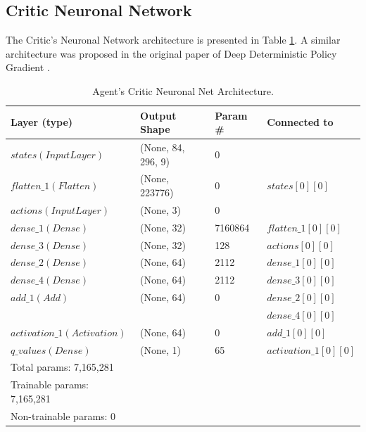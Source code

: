 \documentclass[peerreview,onecolumn]{IEEEtran}
\begin{document}
	 \subsection{Critic Neuronal Network}
	 
	 The Critic's Neuronal Network architecture is presented in Table \ref{tab:critic_arch}. A similar architecture was proposed in the original paper of Deep Deterministic Policy Gradient \cite{ddpg_2015}. 
	 
	 
	 
	  \begin{table}[h] 
	\centering
	\begin{tabular}{l l l l} 
		\toprule 				
		Layer (type)          &          Output Shape   &      Param \#   &  Connected to  \\
		\midrule           
		$states (InputLayer) $   &         (None, 84, 296, 9)  & 0 &    \\                          
		$flatten\_1 (Flatten) $   &         (None, 223776) &      0 &          $states[0][0]   $    \\
		$actions (InputLayer)$  &  (None, 3)    &        0      &             \\
		$dense\_1 (Dense)  $ &  (None, 32)  & 7160864  &   $flatten\_1[0][0] $ \\
        $dense\_3 (Dense)  $ & (None, 32) & 128 &  $actions[0][0]$ \\
		$dense\_2 (Dense) $  & (None, 64) & 2112  &  $dense\_1[0][0] $ \\ 
        $dense\_4 (Dense) $ & (None, 64) & 2112 &  $dense\_3[0][0]$ \\
		$add\_1 (Add) $ & (None, 64) &  0  & $dense\_2[0][0] $ \\                   
                                                                &&& $dense\_4[0][0] $ \\
		$activation\_1 (Activation) $ & (None, 64) & 0 & $add\_1[0][0]$ \\
		$q\_values (Dense) $ & (None, 1)& 65 & $activation\_1[0][0] $ \\
		\midrule
		\midrule
Total params: 7,165,281 & & &\\
Trainable params: 7,165,281 & & & \\
Non-trainable params: 0 & & & \\

		\midrule 
		\bottomrule 
	\end{tabular}
	\smallskip 
	\caption{Agent's Critic Neuronal Net Architecture.} 
	\label{tab:critic_arch} 
\end{table}
	 
\end{document}
